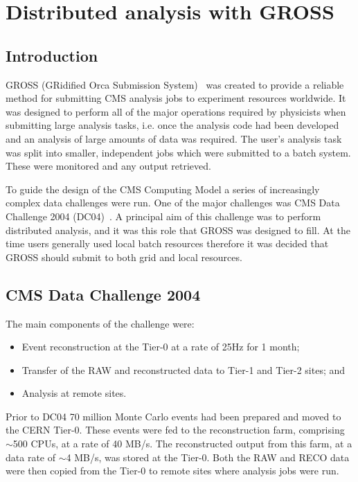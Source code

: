 \chapter{Distributed analysis with GROSS}

\section{Introduction}
GROSS (GRidified Orca Submission System)~\cite{CHEP04_TALLINI} was created to provide a reliable method for submitting CMS analysis jobs to experiment resources worldwide. It was designed to perform all of the major operations required by physicists when submitting large analysis tasks, i.e. once the analysis code had been developed and an analysis of large amounts of data was required. The user's analysis task was split into smaller, independent jobs which were submitted to a batch system. These were monitored and any output retrieved.


To guide the design of the CMS Computing Model a series of increasingly complex data challenges were run. One of the major challenges was CMS Data Challenge 2004 (DC04)~\cite{citeulike:876074}. A principal aim of this challenge was to perform distributed analysis, and it was this role that GROSS was designed to fill. At the time users generally used local batch resources therefore it was decided that GROSS should submit to both grid and local resources. 

\section{CMS Data Challenge 2004}
The main components of the challenge were:
\begin{itemize}
\item{Event reconstruction at the Tier-0 at a rate of 25Hz for 1 month;}
\item{Transfer of the RAW and reconstructed data to Tier-1 and Tier-2 sites; and}
\item{Analysis at remote sites.}
\end{itemize}
Prior to DC04 70 million Monte Carlo events had been prepared and moved to the CERN Tier-0. These events were fed to the reconstruction farm, comprising $\sim$500 CPUs, at a rate of 40 MB/s. The reconstructed output from this farm, at a data rate of $\sim$4 MB/s, was stored at the Tier-0. Both the RAW and RECO data were then copied from the Tier-0 to remote sites where analysis jobs were run.

